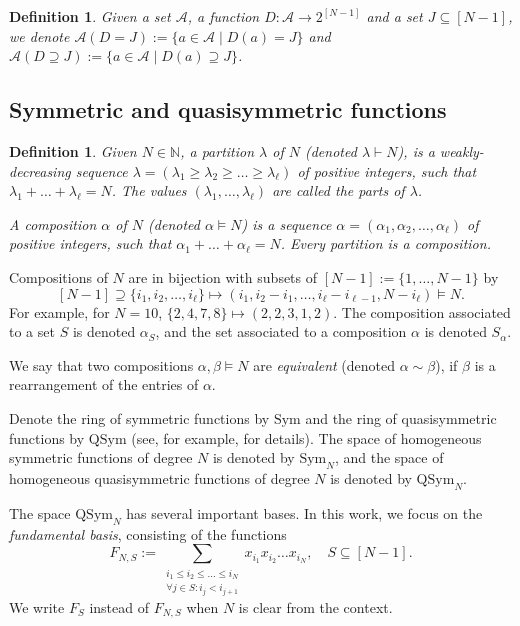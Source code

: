 \documentclass[11pt]{article}
\newtheorem{definition}[theo]{Definition}
\theoremstyle{definition}
\numberwithin{equation}{section}
\newcommand{\sym}{\mathrm{Sym}}
\newcommand{\qsym}{\mathrm{QSym}}
\newcommand{\NN}{\mathbb{N}}
\newcommand{\A}{\mathcal{A}}
\begin{document}
\begin{definition}
\label{def:elements with given stat}
    Given a set $\A$, a function $D:\A \to 2^{[N-1]}$ and a set $J \subseteq [N-1]$, we denote $\A(D=J) := \{a \in \A \mid D(a) = J\}$ and $\A(D \supseteq J) := \{a \in \A \mid D(a) \supseteq J\}$.
\end{definition}

\subsection{Symmetric and quasisymmetric functions}
\label{subsec:definitions symmetric functions}

\begin{definition}
    Given $N \in \NN$, a \emph{partition} $\lambda$ of $N$ (denoted $\lambda \vdash N$), is a weakly-decreasing sequence $\lambda = (\lambda_1 \ge \lambda_2 \ge \dots \ge \lambda_\ell)$ of positive integers, such that $\lambda_1 + \dots + \lambda_\ell = N$. The values $(\lambda_1,\dots,\lambda_\ell)$ are called the \emph{parts} of $\lambda$.
    
    A \emph{composition} $\alpha$ of $N$ (denoted $\alpha \vDash N$) is a sequence $\alpha = (\alpha_1, \alpha_2, \dots, \alpha_\ell )$ of positive integers, such that $\alpha_1 + \dots + \alpha_\ell = N$. Every partition is a composition.
\end{definition}

Compositions of $N$ are in bijection with subsets of $[N-1] := \{1, \dots, N-1\}$ by 
\[
    [N-1] \supseteq \{i_1, i_2, \dots, i_\ell \} \mapsto (i_1, i_2 - i_1, \dots, i_\ell - i_{\ell-1}, N - i_\ell) \vDash N.
\]
For example, for $N = 10$, $\{2, 4, 7, 8\} \mapsto (2, 2, 3, 1, 2)$. The composition associated to a set $S$ is denoted $\alpha_S$, and the set associated to a composition $\alpha$ is denoted $S_\alpha$.

We say that two compositions $\alpha, \beta \vDash N$ are \emph{equivalent} (denoted $\alpha \sim \beta$), if $\beta$ is a rearrangement of the entries of $\alpha$.

Denote the ring of symmetric functions by $\sym$ and the ring of quasisymmetric functions by $\qsym$ (see, for example, \cite[Section 1]{S3_patterns_list} for details). The space of homogeneous symmetric functions of degree $N$ is denoted by $\sym_N$, and the space of homogeneous quasisymmetric functions of degree $N$ is denoted by $\qsym_N$.

The space $\qsym_N$ has several important bases. In this work, we focus on the \emph{fundamental basis}, consisting of the functions
\[
    F_{N,S} := \sum_{\substack{i_1 \le i_2 \le \dots \le i_N \\ \forall j \in S:i_j < i_{j+1}}} x_{i_1} x_{i_2} \dots x_{i_N},\quad S \subseteq [N - 1].
\]
We write $F_S$ instead of $F_{N,S}$ when $N$ is clear from the context.
\end{document}
